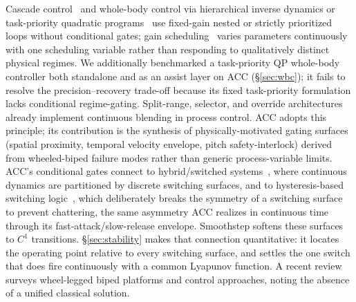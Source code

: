 \documentclass[conference]{IEEEtran}
\begin{document}
Cascade control~\cite{cascade_standard} and whole-body control via hierarchical inverse dynamics or task-priority quadratic programs~\cite{herzog2016wbc,bellicoso2018wbc,escande2014hqp} use fixed-gain nested or strictly prioritized loops without conditional gates; gain scheduling~\cite{gain_scheduling_survey,leith2000gainsched} varies parameters continuously with one scheduling variable rather than responding to qualitatively distinct physical regimes.
We additionally benchmarked a task-priority QP whole-body controller both standalone and as an assist layer on ACC (\S\ref{sec:wbc}); it fails to resolve the precision--recovery trade-off because its fixed task-priority formulation lacks conditional regime-gating.
Split-range, selector, and override architectures~\cite{shinskey1996,astrom2005advanced} already implement continuous blending in process control. ACC adopts this principle; its contribution is the synthesis of physically-motivated gating surfaces (spatial proximity, temporal velocity envelope, pitch safety-interlock) derived from wheeled-biped failure modes rather than generic process-variable limits.
ACC's conditional gates connect to hybrid/switched systems~\cite{liberzon2003switching}, where continuous dynamics are partitioned by discrete switching surfaces, and to hysteresis-based switching logic~\cite{hespanha2003hysteresis}, which deliberately breaks the symmetry of a switching surface to prevent chattering, the same asymmetry ACC realizes in continuous time through its fast-attack/slow-release envelope. Smoothstep softens these surfaces to $C^1$ transitions. \S\ref{sec:stability} makes that connection quantitative: it locates the operating point relative to every switching surface, and settles the one switch that does fire continuously with a common Lyapunov function.
A recent review~\cite{liu2024review} surveys wheel-legged biped platforms and control approaches, noting the absence of a unified classical solution.
\end{document}
